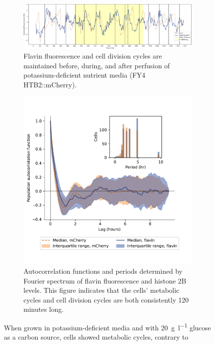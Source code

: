 \begin{figure}
  \centering
  \begin{subfigure}[htpb]{1.0\textwidth}
   \centering
   \includegraphics[width=\textwidth]{htb2mCherry_613_plots_single_htb2mCherry012_90_2_adapted.pdf}
   \caption{
     Flavin fluorescence and cell division cycles are maintained before, during, and after perfusion of potassium-deficient nutrient media (FY4 HTB2::mCherry).
   }
   \label{fig:biology-kdeficient-single}
  \end{subfigure}

  \begin{subfigure}[htpb]{0.7\textwidth}
   \centering
   \includegraphics[width=\textwidth]{htb2mCherry_613_12.pdf}
   \caption{
     Autocorrelation functions and periods determined by Fourier spectrum of flavin fluorescence and histone 2B levels.
     This figure indicates that the cells' metabolic cycles and cell division cycles are both consistently 120 minutes long.
   }
   \label{fig:biology-kdeficient-acf}
  \end{subfigure}

  \caption{
    When grown in potassium-deficient media and with \SI{20}{\gram~\litre^{-1}} glucose as a carbon source, cells showed metabolic cycles, contrary to \textcite{oneillEukaryoticCellBiology2020}
  }
  \label{fig:biology-kdeficient}
\end{figure}


